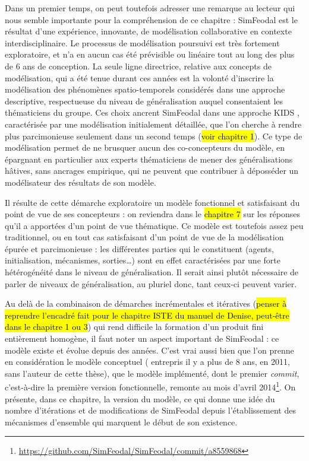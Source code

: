 Dans un premier temps, on peut toutefois adresser une remarque au lecteur qui nous semble importante pour la compréhension de ce chapitre : SimFeodal est le résultat d'une expérience, innovante, de modélisation collaborative en contexte interdisciplinaire.
Le processus de modélisation poursuivi est très fortement exploratoire, et n'a en aucun cas été prévisible ou linéaire tout au long des plus de 6 ans de conception.
La seule ligne directrice, relative aux concepts de modélisation, qui a été tenue durant ces années est la volonté d'inscrire la modélisation des phénomènes spatio-temporels considérés dans une approche descriptive, respectueuse du niveau de généralisation auquel consentaient les thématiciens du groupe.
Ces choix ancrent SimFeodal dans une approche \og KIDS\fg{} \autocite{edmonds_kiss_2005}, caractérisée par une modélisation initialement détaillée, que l'on cherche à rendre plus parcimonieuse seulement dans un second temps (\hl{voir chapitre 1}).
Ce type de modélisation permet de ne brusquer aucun des co-concepteurs du modèle, en épargnant en particulier aux experts thématiciens de mener des généralisations hâtives, sans ancrages empirique, qui ne peuvent que contribuer à déposséder un modélisateur des résultats de son modèle.

Il résulte de cette démarche exploratoire un modèle fonctionnel et satisfaisant du point de vue de ses concepteurs : on reviendra dans le \hl{chapitre 7} sur les réponses qu'il a apportées d'un point de vue thématique.
Ce modèle est toutefois assez peu traditionnel, ou en tout cas satisfaisant d'un point de vue de la modélisation épurée et parcimonieuse : les différentes parties qui le constituent (agents, initialisation, mécanismes, sorties\ldots) sont en effet caractérisées par une forte hétérogénéité dans le niveau de généralisation.
Il serait ainsi plutôt nécessaire de parler de niveaux de généralisation, au pluriel donc, tant ceux-ci peuvent varier.

Au delà de la combinaison de démarches incrémentales et itératives (\hl{penser à reprendre l'encadré fait pour le chapitre ISTE du manuel de Denise, peut-être dans le chapitre 1 ou 3}) qui rend difficile la formation d'un produit fini entièrement homogène, il faut noter un aspect important de SimFeodal : ce modèle existe et évolue depuis des années.
C'est vrai aussi bien que l'on prenne en considération le modèle conceptuel ( entrepris il y a plus de 8 ans, en 2011, sans l'auteur de cette thèse), que le modèle implémenté, dont le premier \textit{commit}, c'est-à-dire la première version fonctionnelle, remonte au mois d'avril 2014\footnote{
\href{https://github.com/SimFeodal/SimFeodal/commit/a85598682cda2350b08ea789b966e613dacb1b05}{https://github.com/SimFeodal/SimFeodal/commit/a8559868}}.
On présente, dans ce chapitre, la version \fg{} du modèle, ce qui donne une idée du nombre d'itérations et de modifications de SimFeodal depuis l'établissement des mécanismes d'ensemble qui marquent le début de son existence.

